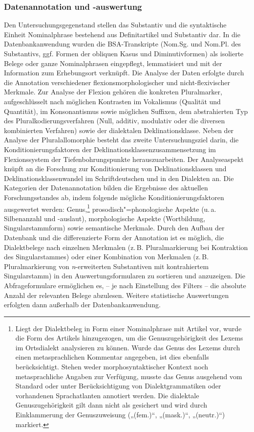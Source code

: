 \subsubsection{Datenannotation und -auswertung}
\label{sec:6.3.1.4}
Den Untersuchungsgegenstand stellen das Substantiv und die syntaktische Einheit Nomi\-nal\-phrase bestehend aus Definitartikel und Substantiv dar. In die Datenbankanwendung wurden die BSA-Transkripte (Nom.Sg. und Nom.Pl. des Substantivs, ggf. Formen der obliquen Kasus und Diminutivformen) als isolierte Belege oder ganze Nominalphrasen eingepflegt, lemmatisiert und mit der Information zum Erhebungsort verknüpft. Die Analyse der Daten erfolgte durch die Annotation verschiedener flexionsmorphologischer und nicht-flexivischer Merkmale. Zur Analyse der Flexion gehören die konkreten Pluralmarker, aufgeschlüsselt nach möglichen Kontrasten im Vokalismus (Qualität und Quantität), im Konsonantismus sowie möglichen Suffixen, dem abstrahierten Typ des Pluralkodierungsverfahren (Null, additiv, modulativ oder die diversen kombinierten Verfahren) sowie der dialektalen Deklinationsklasse. Neben der Analyse der Pluralallomorphie besteht das zweite Untersuchungsziel darin, die Konditionierungsfaktoren der Deklinationsklassenzusammensetzung im Flexionssystem der Tiefenbohrungspunkte herauszuarbeiten. Der Analyseaspekt knüpft an die Forschung zur Konditionierung von Deklinationsklassen und Deklinationsklassenwandel im Schriftdeutschen und in den Dialekten an. Die Kategorien der Datenannotation bilden die Ergebnisse des aktuellen Forschungsstandes ab, indem folgende mögliche Konditionierungsfaktoren ausgewertet werden: Genus,\footnote{Liegt der Dialektbeleg in Form einer Nominalphrase mit Artikel vor, wurde die Form des Artikels hinzugezogen, um die Genuszugehörigkeit des Lexems im Ortsdialekt analysieren zu können. Wurde das Genus des Lexems durch einen metasprachlichen Kommentar angegeben, ist dies ebenfalls berücksichtigt. Stehen weder morphosyntaktischer Kontext noch metasprachliche Angaben zur Verfügung, musste das Genus ausgehend vom Standard oder unter Berücksichtigung von Dialektgrammatiken oder vorhandenen Sprachatlanten annotiert werden. Die dialektale Genuszugehörigkeit gilt dann nicht als gesichert und wird durch Einklammerung der Genuszuweisung („(fem.)“, „(mask.)“, „(neutr.)“) markiert.} prosodisch"=phonologische Aspekte (u.\,a. Silbenanzahl und -auslaut), morphologische Aspekte (Wortbildung, Singularstammform) sowie semantische Merkmale. Durch den Aufbau der Datenbank und die differenzierte Form der Annotation  ist es möglich, die Dialektbelege nach einzelnen Merkmalen (z.\,B. Pluralmarkierung bei Kontraktion des Singularstammes) oder einer Kombination von Merkmalen (z.\,B. Pluralmarkierung von \textit{n}{}-erweiterten Substantiven mit kontrahiertem Singularstamm) in den Auswertungsformularen zu sortieren und anzuzeigen. Die Abfrageformulare ermöglichen es, -- je nach Einstellung des Filters -- die absolute Anzahl der relevanten Belege abzulesen. Weitere statistische Auswertungen erfolgten dann außerhalb der Datenbankanwendung.

